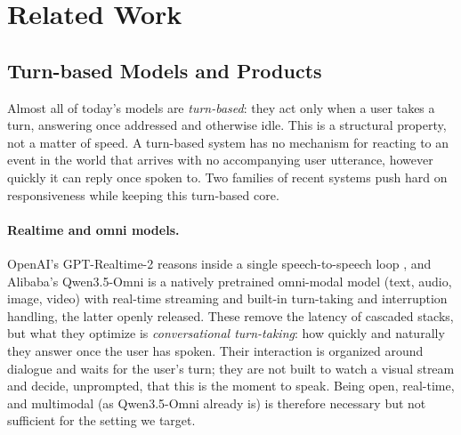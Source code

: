 \documentclass{llmxive}
\begin{document}
\section{Related Work}

\subsection{Turn-based Models and Products}
\label{sec:product}
Almost all of today's models are \textit{turn-based}: they act only when a user takes a turn, answering once addressed and otherwise idle. This is a structural property, not a matter of speed. A turn-based system has no mechanism for reacting to an event in the world that arrives with no accompanying user utterance, however quickly it can reply once spoken to. Two families of recent systems push hard on responsiveness while keeping this turn-based core.

\paragraph{\textbf{Realtime and omni models.}} OpenAI's GPT-Realtime-2 reasons inside a single speech-to-speech loop \cite{openai2026gptrealtime2}, and Alibaba's Qwen3.5-Omni \cite{qwen2026omni} is a natively pretrained omni-modal model (text, audio, image, video) with real-time streaming and built-in turn-taking and interruption handling, the latter openly released. These remove the latency of cascaded stacks, but what they optimize is \textit{conversational turn-taking}: how quickly and naturally they answer once the user has spoken. Their interaction is organized around dialogue and waits for the user's turn; they are not built to watch a visual stream and decide, unprompted, that this is the moment to speak. Being open, real-time, and multimodal (as Qwen3.5-Omni already is) is therefore necessary but not sufficient for the setting we target.
\end{document}
